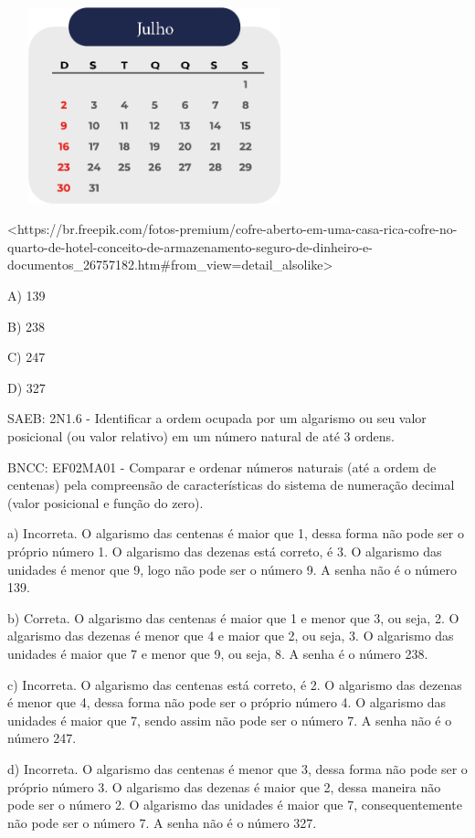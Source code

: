 \includegraphics[width=3.35417in,height=2.23611in]{media/image130.png}

\textless{}https://br.freepik.com/fotos-premium/cofre-aberto-em-uma-casa-rica-cofre-no-quarto-de-hotel-conceito-de-armazenamento-seguro-de-dinheiro-e-documentos\_26757182.htm\#from\_view=detail\_alsolike\textgreater{}

A) 139

B) 238

C) 247

D) 327

SAEB: 2N1.6 - Identificar a ordem ocupada por um algarismo ou seu valor
posicional (ou valor relativo) em um número natural de até 3 ordens.

BNCC: EF02MA01 - Comparar e ordenar números naturais (até a ordem de
centenas) pela compreensão de características do sistema de numeração
decimal (valor posicional e função do zero).

a) Incorreta. O algarismo das centenas é maior que 1, dessa forma não
pode ser o próprio número 1. O algarismo das dezenas está correto, é 3.
O algarismo das unidades é menor que 9, logo não pode ser o número 9. A
senha não é o número 139.

b) Correta. O algarismo das centenas é maior que 1 e menor que 3, ou
seja, 2. O algarismo das dezenas é menor que 4 e maior que 2, ou seja,
3. O algarismo das unidades é maior que 7 e menor que 9, ou seja, 8. A
senha é o número 238.

c) Incorreta. O algarismo das centenas está correto, é 2. O algarismo
das dezenas é menor que 4, dessa forma não pode ser o próprio número 4.
O algarismo das unidades é maior que 7, sendo assim não pode ser o
número 7. A senha não é o número 247.

d) Incorreta. O algarismo das centenas é menor que 3, dessa forma não
pode ser o próprio número 3. O algarismo das dezenas é maior que 2,
dessa maneira não pode ser o número 2. O algarismo das unidades é maior
que 7, consequentemente não pode ser o número 7. A senha não é o número
327.

